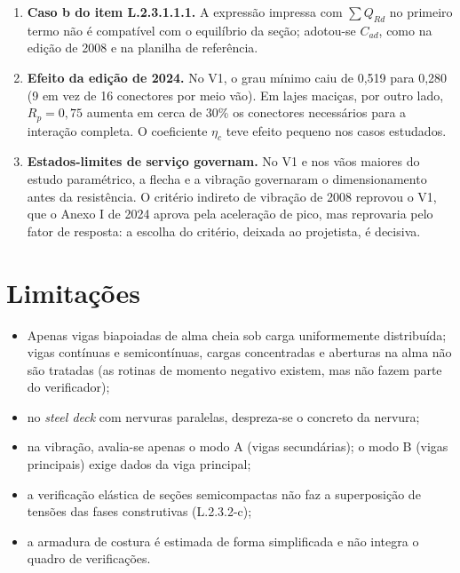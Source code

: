 \begin{enumerate}
Essas correções ilustram o valor de testes contra referências independentes no desenvolvimento de software de engenharia.
\item \textbf{Caso b do item L.2.3.1.1.1.} A expressão impressa com $\sum Q_{Rd}$ no primeiro termo não é compatível com o equilíbrio da seção; adotou-se $C_{ad}$, como na edição de 2008 e na planilha de referência.
\item \textbf{Efeito da edição de 2024.} No V1, o grau mínimo caiu de 0,519 para 0,280 (9 em vez de 16 conectores por meio vão). Em lajes maciças, por outro lado, $R_p = 0{,}75$ aumenta em cerca de 30\% os conectores necessários para a interação completa. O coeficiente $\eta_c$ teve efeito pequeno nos casos estudados.
\item \textbf{Estados-limites de serviço governam.} No V1 e nos vãos maiores do estudo paramétrico, a flecha e a vibração governaram o dimensionamento antes da resistência. O critério indireto de vibração de 2008 reprovou o V1, que o Anexo I de 2024 aprova pela aceleração de pico, mas reprovaria pelo fator de resposta: a escolha do critério, deixada ao projetista, é decisiva.
\end{enumerate}

\section{Limitações}\label{sec:5.2}
\begin{itemize}
\item Apenas vigas biapoiadas de alma cheia sob carga uniformemente distribuída; vigas contínuas e semicontínuas, cargas concentradas e aberturas na alma não são tratadas (as rotinas de momento negativo existem, mas não fazem parte do verificador);
\item no \emph{steel deck} com nervuras paralelas, despreza-se o concreto da nervura;
\item na vibração, avalia-se apenas o modo A (vigas secundárias); o modo B (vigas principais) exige dados da viga principal;
\item a verificação elástica de seções semicompactas não faz a superposição de tensões das fases construtivas (L.2.3.2-c);
\item a armadura de costura é estimada de forma simplificada e não integra o quadro de verificações.
\end{itemize}

